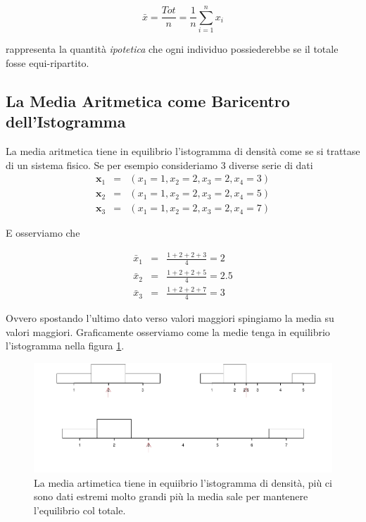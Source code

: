 \documentclass[
  11pt,
]{book}
\theoremstyle{mytheoremstyle}
\theoremstyle{mydefstyle}
\begin{document}
\[\bar x=\frac {Tot}n=\frac 1 n \sum_{i=1}^nx_i \]

rappresenta la quantità \emph{ipotetica} che ogni individuo possiederebbe se il totale fosse equi-ripartito.

\subsection{La Media Aritmetica come Baricentro dell'Istogramma}\label{la-media-aritmetica-come-baricentro-dellistogramma}

La media aritmetica tiene in equilibrio l'istogramma di densità come se si trattase di un sistema fisico. Se per esempio consideriamo 3 diverse serie di dati
\begin{eqnarray*}
  \mathbf{x}_1 &=&  (x_1 =1,x_2=2,x_3=2,x_4=3)\\
  \mathbf{x}_2 &=&  (x_1 =1,x_2=2,x_3=2,x_4=5)\\
  \mathbf{x}_3 &=&  (x_1 =1,x_2=2,x_3=2,x_4=7)
\end{eqnarray*}

E osserviamo che

\begin{eqnarray*}
  \bar x_1 &=&  \frac{1+2+2+3}{4}=2\\
  \bar x_2 &=&\frac{1+2+2+5}{4}=2.5\\
  \bar x_3 &=&\frac{1+2+2+7}{4}=3
\end{eqnarray*}

Ovvero spostando l'ultimo dato verso valori maggiori spingiamo la media su valori maggiori.
Graficamente osserviamo come la medie tenga in equilibrio l'istogramma nella figura \ref{fig:medh}.

\begin{figure}[H]

{\centering \includegraphics{Appunti_di_Statistica_2025_files/figure-latex/medh-1} 

}

\caption{La media artimetica tiene in equiibrio l'istogramma di densità, più ci sono dati estremi molto grandi più la media sale per mantenere l'equilibrio col totale.}\label{fig:medh}
\end{figure}
\end{document}
